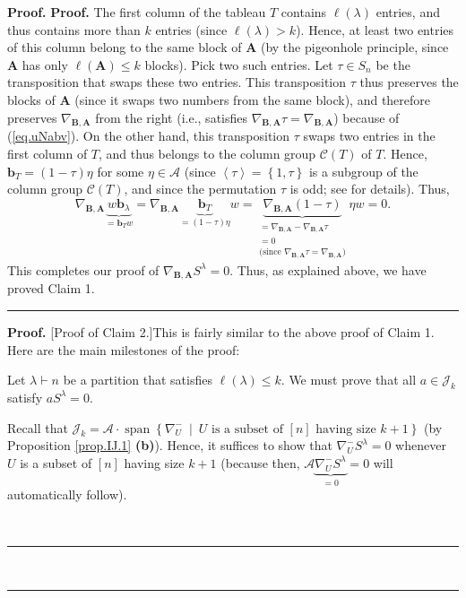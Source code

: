 \documentclass[numbers=enddot,12pt,final,onecolumn,notitlepage]{scrartcl}%
\numberwithin{exer}{subsection}
\theoremstyle{definition}
\newenvironment{proof}[1][Proof]{\noindent\textbf{#1.} }{\ \rule{0.5em}{0.5em}}
\begin{document}
\begin{proof}
\begin{proof}
The first column of the tableau $T$ contains $\ell\left(  \lambda\right)  $
entries, and thus contains more than $k$ entries (since $\ell\left(
\lambda\right)  >k$). Hence, at least two entries of this column belong to the
same block of $\mathbf{A}$ (by the pigeonhole principle, since $\mathbf{A}$
has only $\ell\left(  \mathbf{A}\right)  \leq k$ blocks). Pick two such
entries. Let $\tau\in S_{n}$ be the transposition that swaps these two
entries. This transposition $\tau$ thus preserves the blocks of $\mathbf{A}$
(since it swaps two numbers from the same block), and therefore preserves
$\nabla_{\mathbf{B},\mathbf{A}}$ from the right (i.e., satisfies
$\nabla_{\mathbf{B},\mathbf{A}}\tau=\nabla_{\mathbf{B},\mathbf{A}}$) because
of (\ref{eq.uNabv}). On the other hand, this transposition $\tau$ swaps two
entries in the first column of $T$, and thus belongs to the column group
$\mathcal{C}\left(  T\right)  $ of $T$. Hence, $\mathbf{b}_{T}=\left(
1-\tau\right)  \eta$ for some $\eta\in\mathcal{A}$ (since $\left\langle
\tau\right\rangle =\left\{  1,\tau\right\}  $ is a subgroup of the column
group $\mathcal{C}\left(  T\right)  $, and since the permutation $\tau$ is
odd; see \cite[Proposition 5.5.9 \textbf{(b)}]{sga} for details). Thus,%
\[
\nabla_{\mathbf{B},\mathbf{A}}\underbrace{w\mathbf{b}_{\lambda}}%
_{=\mathbf{b}_{T}w}=\nabla_{\mathbf{B},\mathbf{A}}\underbrace{\mathbf{b}_{T}%
}_{=\left(  1-\tau\right)  \eta}w=\underbrace{\nabla_{\mathbf{B},\mathbf{A}%
}\left(  1-\tau\right)  }_{\substack{=\nabla_{\mathbf{B},\mathbf{A}}%
-\nabla_{\mathbf{B},\mathbf{A}}\tau\\=0\\\text{(since }\nabla_{\mathbf{B}%
,\mathbf{A}}\tau=\nabla_{\mathbf{B},\mathbf{A}}\text{)}}}\eta w=0.
\]
This completes our proof of $\nabla_{\mathbf{B},\mathbf{A}}S^{\lambda}=0$.
Thus, as explained above, we have proved Claim 1.
\end{proof}

\begin{proof}
[Proof of Claim 2.]This is fairly similar to the above proof of Claim 1. Here
are the main milestones of the proof:

Let $\lambda\vdash n$ be a partition that satisfies $\ell\left(
\lambda\right)  \leq k$. We must prove that all $a\in\mathcal{J}_{k}$ satisfy
$aS^{\lambda}=0$.

Recall that $\mathcal{J}_{k}=\mathcal{A}\cdot\operatorname*{span}\left\{
\nabla_{U}^{-}\ \mid\ U\text{ is a subset of }\left[  n\right]  \text{ having
size }k+1\right\}  $ (by Proposition \ref{prop.IJ.1} \textbf{(b)}). Hence, it
suffices to show that $\nabla_{U}^{-}S^{\lambda}=0$ whenever $U$ is a subset
of $\left[  n\right]  $ having size $k+1$ (because then, $\mathcal{A}%
\underbrace{\nabla_{U}^{-}S^{\lambda}}_{=0}=0$ will automatically follow).


\end{proof}
\end{proof}
\end{document}
